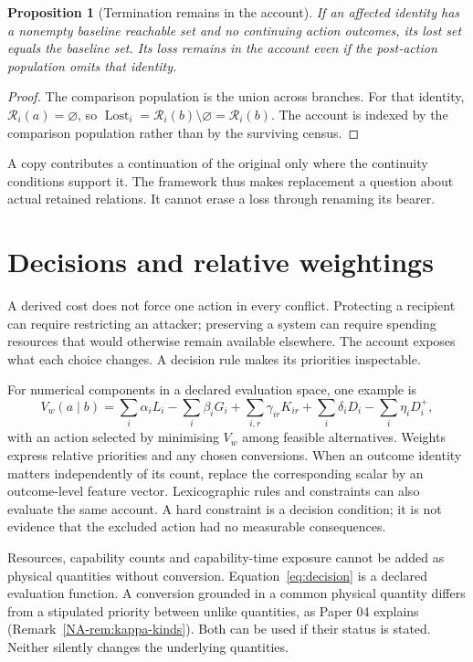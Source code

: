 \documentclass[11pt,a4paper]{article}
\newtheorem{proposition}[definition]{Proposition}
\theoremstyle{remark}
\newcommand{\R}{\mathcal R}
\newcommand{\Lost}{\operatorname{Lost}}
\begin{document}
\begin{proposition}[Termination remains in the account]\label{prop:termination}
If an affected identity has a nonempty baseline reachable set and no continuing
action outcomes, its lost set equals the baseline set. Its loss remains in the
account even if the post-action population omits that identity.
\end{proposition}
\begin{proof}
The comparison population is the union across branches. For that identity,
$\R_i(a)=\varnothing$, so
$\Lost_i=\R_i(b)\setminus\varnothing=\R_i(b)$. The account is indexed by the
comparison population rather than by the surviving census.
\end{proof}

A copy contributes a continuation of the original only where the continuity
conditions support it. The framework thus makes replacement a question about
actual retained relations. It cannot erase a loss through renaming its bearer.

\section{Decisions and relative weightings}\label{sec:decisions}

A derived cost does not force one action in every conflict. Protecting a recipient
can require restricting an attacker; preserving a system can require spending
resources that would otherwise remain available elsewhere. The account exposes
what each choice changes. A decision rule makes its priorities inspectable.

For numerical components in a declared evaluation space, one example is
\begin{equation}\label{eq:decision}
V_w(a\mid b)=\sum_i\alpha_iL_i-\sum_i\beta_iG_i
 +\sum_{i,r}\gamma_{ir}K_{ir}+\sum_i\delta_iD_i-\sum_i\eta_iD_i^+,
\end{equation}
with an action selected by minimising $V_w$ among feasible alternatives.
Weights express relative priorities and any chosen conversions. When an outcome
identity matters independently of its count, replace the corresponding scalar
by an outcome-level feature vector. Lexicographic rules and constraints can
also evaluate the same account. A hard constraint is a decision condition;
it is not evidence that the excluded action had no measurable consequences.

Resources, capability counts and capability-time exposure cannot be added as
physical quantities without conversion. Equation~\eqref{eq:decision} is a
declared evaluation function. A conversion grounded in a common physical
quantity differs from a stipulated priority between unlike quantities, as
Paper 04 explains (Remark~\ref{NA-rem:kappa-kinds}). Both can be used if their
status is stated. Neither silently changes the underlying quantities.
\end{document}
